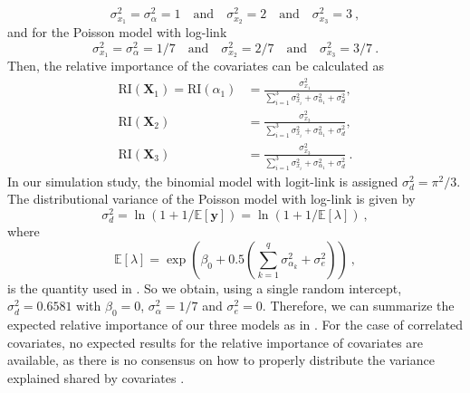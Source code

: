 \begin{equation}
    \sigma_{x_1}^2 = \sigma_{\alpha}^2  = 1 \quad \text{and} \quad \sigma_{x_2}^2 = 2 \quad \text{and} \quad \sigma_{x_3}^2 = 3 \ ,
\end{equation}
and for the Poisson model with log-link
\begin{equation}
    \sigma_{x_1}^2 = \sigma_{\alpha}^2  = 1/7 \quad \text{and} \quad \sigma_{x_2}^2 = 2/7 \quad \text{and} \quad \sigma_{x_3}^2 = 3/7 \ .
\end{equation}
Then, the relative importance of the covariates can be calculated as
\begin{equation}
    \begin{aligned}
        \text{RI}(\mathbf{X}_{1})  = \text{RI}(\alpha_1)  &= \frac{\sigma_{x_1}^2}{\sum_{i=1}^{3}\sigma_{x_i}^2 +\sigma_{\alpha_1}^2  + \sigma_d^2}, \\
        \text{RI}(\mathbf{X}_2) &= \frac{\sigma_{x_3}^2}{\sum_{i=1}^{3}\sigma_{x_i}^2 +\sigma_{\alpha_1}^2 +  \sigma_d^2}, \\
        \text{RI}(\mathbf{X}_3) &= \frac{\sigma_{x_3}^2}{\sum_{i=1}^{3}\sigma_{x_i}^2 +\sigma_{\alpha_1}^2 +  \sigma_d^2} \ .
    \end{aligned}
\end{equation}
In our simulation study, the binomial model with logit-link is assigned $\sigma^2_d=\pi^2/3$. The distributional variance of the Poisson model with log-link is given by 
\begin{equation}
    \sigma_d^2 = \ln (1 + 1/\mathbb{E}[\mathbf{y}]) = \ln (1 + 1/\mathbb{E}[\lambda]) \ ,
\end{equation}
where 
\begin{equation}
    \label{eq:lambda}
    \mathbb{E}[\lambda]=\exp\left(\beta_0 + 0.5 (\sum_{k=1}^q \sigma_{\alpha_k}^2 + \sigma^2_e)\right) \ ,
\end{equation}
is the quantity used in  \citep{nakagawa2017}. So we obtain, using a single random intercept, $\sigma_{d}^2=0.6581$ with $\beta_0=0$, $\sigma^2_{\alpha}=1/7$ and $\sigma^2_e=0$. Therefore, we can summarize the expected relative importance of our three models as in . For the case of correlated covariates, no expected results for the relative importance of covariates are available, as there is no consensus on how to properly distribute the variance explained shared by covariates \citep{gromping_relaimpo}.
